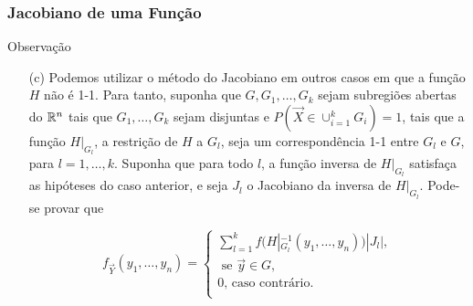 \begin{frame}
\frametitle{\textbf{Jacobiano de uma Função}}
\baselineskip=13pt
\begin{block}{Observação}

\begin{enumerate}
\item[(c)] Podemos utilizar o método do Jacobiano em outros casos em que a função $H$ não é 1-1. Para tanto, suponha que $G,G_1,\ldots,G_k$ sejam subregiões abertas do $\mathbb{R}^n$ tais que $G_1,\ldots,G_k$ sejam disjuntas e $P(\vec{X}\in\cup_{i=1}^{k}G_i)=1$, tais que a função $H|_{G_l}$, a restrição de $H$ a $G_l$, seja um correspondência 1-1 entre $G_l$ e $G$, para $l=1,\ldots,k$. Suponha que para todo $l$, a função inversa de $H|_{G_l}$ satisfaça as hipóteses do caso anterior, e seja $J_l$ o Jacobiano da inversa de $H|_{G_l}$. Pode-se provar que


\[
f_{\vec{Y}}(y_1,\ldots,y_n)=\left\{
\begin{array}{l}
\sum_{l=1}^{k}f(H|_{G_l}^{-1}(y_1,\ldots,y_n))|J_l|, \\
\mbox{\ \ \ se $\vec{y}\in G$,} \\
0 \mbox{, caso contrário.}\\
\end{array}
\right.
\]

\end{enumerate}

\end{block}
\end{frame}



